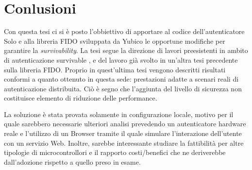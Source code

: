 \chapter{Conlusioni}
\label{conclusioni}

Con questa tesi ci si è posto l'obbiettivo di apportare al codice dell'autenticatore Solo e alla libreria FIDO sviluppata da Yubico le opportune modifiche per garantire la \emph{survivability}. La tesi segue la direzione di lavori preesistenti in ambito di autenticazione survivable \cite{magnanini:survivable}, e del lavoro già svolto in un'altra tesi precedente sulla libreria FIDO. Proprio in quest'ultima tesi vengono descritti risultati conformi a quanto ottenuto in questa sede: prestazioni adatte a scenari reali di autenticazione distribuita. Ciò è segno che l'aggiunta del livello di sicurezza non costituisce elemento di riduzione delle performance.

La soluzione è stata provata solamente in configurazione locale, motivo per il quale sarebbero necessarie ulteriori analisi prevedendo un autenticatore hardware reale e l'utilizzo di un Browser tramite il quale simulare l'interazione dell'utente con un servizio Web. Inoltre, sarebbe interessante studiare la fattibilità per altre tipologie di microcontrollori e il rapporto costi/benefici che ne deriverebbe dall'adozione rispetto a quello preso in esame. 